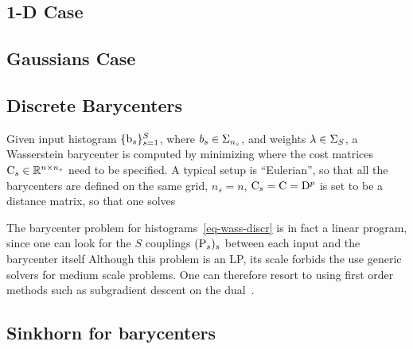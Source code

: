 
  
  
\subsection{1-D Case}




\subsection{Gaussians Case}

 
 
 
\subsection{Discrete Barycenters}
   
Given input histogram $\{\b_s\}_{s=1}^S$, where $b_s \in \simplex_{n_s}$, and weights $\la \in \simplex_S$, a Wasserstein barycenter is computed by minimizing
where the cost matrices $\C_s \in \RR^{n \times n_s}$ need to be specified. 
%
A typical setup is ``Eulerian'', so that all the barycenters are defined on the same grid, $n_s=n$, $\C_s=\C=\distD^p$ is set to be a distance matrix, so that one solves


The barycenter problem for histograms~\eqref{eq-wass-discr} is in fact a linear program, since one can look for the $S$ couplings $(\P_s)_s$ between each input and the barycenter itself
Although this problem is an LP, its scale forbids the use generic solvers for medium scale problems. One can therefore resort to using first order methods such as subgradient descent on the dual~\cite{Carlier-NumericsBarycenters}.

\subsection{Sinkhorn for barycenters}

